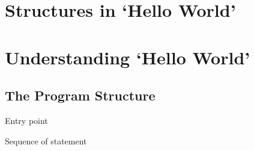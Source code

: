 \section{Structures in `Hello World'} %
\label{sec:structures_in_hello_world_}




\section{Understanding `Hello World'} %
\label{sec:understanding_hello_world_}

\subsection{The Program Structure} %
\label{sub:the_program_structure}

Entry point

Sequence of statement


